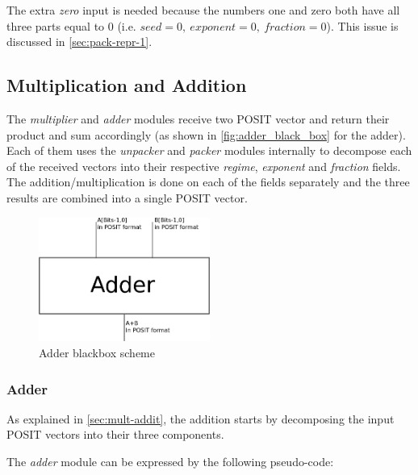\documentclass[10pt]{article}
\begin{document}
The extra \textit{zero} input is needed because the numbers one and zero both
have all three parts equal to 0 (i.e. $seed=0,\ exponent=0,\ fraction=0$).
This issue is discussed in \autoref{sec:pack-repr-1}.

\subsection{Multiplication and Addition}\label{sec:mult-addit}

The \textit{multiplier} and \textit{adder} modules receive two POSIT vector and return
their product and sum accordingly (as shown in \autoref{fig:adder_black_box} for
the adder).
Each of them uses the \textit{unpacker} and \textit{packer}
modules internally to decompose each of the received vectors into their
respective \textit{regime}, \textit{exponent} and \textit{fraction} fields.
The addition/multiplication is done on each of the fields separately and the
three results are combined into a single POSIT vector.

\begin{figure}[h]
  \centering
  \includegraphics*[width=0.5\textwidth, height=0.2\paperheight]{adder_blackbox}
  \caption{Adder blackbox scheme}
  \label{fig:adder_black_box}
\end{figure}

\subsubsection{Adder}\label{sec:adder}

As explained in \autoref{sec:mult-addit}, the addition starts by decomposing the
input POSIT vectors into their three components.

The \textit{adder} module can be expressed by the following pseudo-code: \\
\end{document}
